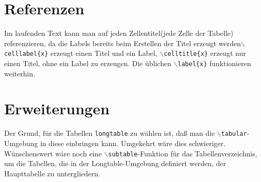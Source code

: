\documentclass[10pt,a4paper]{article}%
\begin{document}
\section{Referenzen}
Im laufenden Text kann man auf jeden Zellentitel(jede Zelle der Tabelle) referenzieren, da die Labels
bereits beim Erstellen der Titel erzeugt
werden\texttt{$\backslash$celllabel\{x\}} erzeugt einen Titel und ein Label, \texttt{$\backslash$celltitle\{x\}} erzeugt nur einen
Titel, ohne ein Label zu erzeugen. Die üblichen \texttt{$\backslash$label\{x\}}
funktionieren weiterhin.
\section{Erweiterungen}
Der Grund, für die Tabellen \texttt{longtable} zu wählen ist, daß man die
\texttt{$\backslash$tabular}-Umgebung in diese einbringen kann. Umgekehrt wäre
dies schwieriger. 
Wünschenswert wäre noch eine \texttt{$\backslash$subtable}-Funktion für das
Tabellenverzeichnis, um die Tabellen, die in der Longtable-Umgebung definiert
werden, der Haupttabelle zu untergliedern.
\listoftables
\tableofcontents
\end{document}
